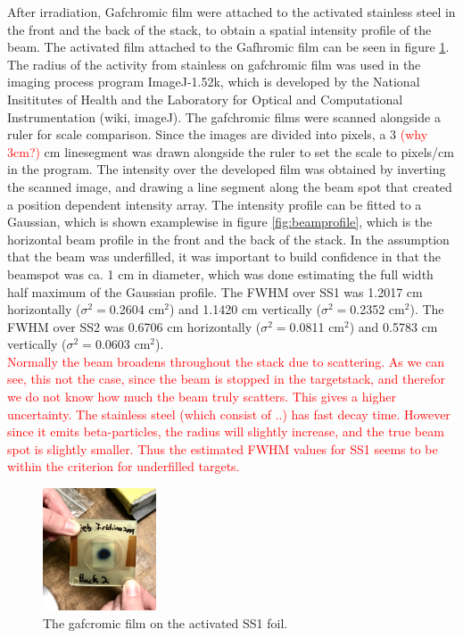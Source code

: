 After irradiation, Gafchromic film were attached to the activated stainless steel in the front and the back of the stack, to obtain a spatial intensity profile of the beam. The activated film attached to the Gafhromic film can be seen in figure \ref{fig:SS1_gafchromic}. The radius of the activity from stainless on gafchromic film was used in the imaging process program ImageJ-1.52k, which is developed by the National Insititutes of Health and the Laboratory for Optical and Computational Instrumentation (wiki, imageJ). The gafchromic films were scanned alongside a ruler for scale comparison. Since the images are divided into pixels, a 3 \textcolor{red}{(why 3cm?)} cm linesegment was drawn alongside the ruler to set the scale to pixels/cm in the program. The intensity over the developed film was obtained by inverting the scanned image, and drawing a line segment along the beam spot that created a position dependent intensity array. The intensity profile can be fitted to a Gaussian, which is shown examplewise in figure \ref{fig:beamprofile}, which is the horizontal beam profile in the front and the back of the stack. In the assumption that the beam was underfilled, it was important to build confidence in that the beamspot was ca. 1 cm in diameter, which was done estimating the full width half maximum of the Gaussian profile. The FWHM over SS1 was 1.2017 cm horizontally ($\sigma^2=$0.2604 cm$^2$) and 1.1420 cm vertically ($\sigma^2=$0.2352 cm$^2$). The FWHM over SS2 was 0.6706 cm horizontally ($\sigma^2=$0.0811 cm$^2$) and 0.5783 cm vertically ($\sigma^2=$0.0603 cm$^2$). \\

\textcolor{red}{Normally the beam broadens throughout the stack due to scattering. As we can see, this not the case, since the beam is stopped in the targetstack, and therefor we do not know how much the beam truly scatters. This gives a higher uncertainty.  
The stainless steel (which consist of ..) has fast decay time. However since it emits beta-particles, the radius will slightly increase, and the true beam spot is slightly smaller. Thus the estimated FWHM values for SS1  seems to be within the criterion for underfilled targets. }



\begin{figure}
    \centering
    \includegraphics[width=0.3\textwidth]{Experiment/gafchromic_beamprofile.jpg}
    \caption{The gafcromic film on the activated SS1 foil. }
    \label{fig:SS1_gafchromic}
\end{figure}

